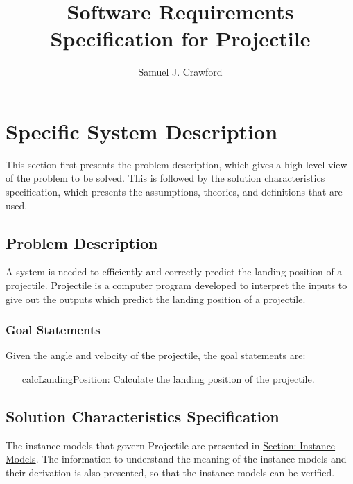 \documentclass[12pt]{article}
\title{Software Requirements Specification for Projectile}
\author{Samuel J. Crawford}
\begin{document}
\maketitle
\tableofcontents
\newpage
\section{Specific System Description}
\label{Sec:SpecSystDesc}
This section first presents the problem description, which gives a high-level view of the problem to be solved. This is followed by the solution characteristics specification, which presents the assumptions, theories, and definitions that are used.
\subsection{Problem Description}
\label{Sec:ProbDesc}
A system is needed to efficiently and correctly predict the landing position of a projectile. Projectile is a computer program developed to interpret the inputs to give out the outputs which predict the landing position of a projectile.
\subsubsection{Goal Statements}
\label{Sec:GoalStmt}
Given the angle and velocity of the projectile, the goal statements are:
\begin{itemize}
\item[calcLandingPosition:\phantomsection\label{calcPosition}]Calculate the landing position of the projectile.
\end{itemize}
\subsection{Solution Characteristics Specification}
\label{Sec:SolCharSpec}
The instance models that govern Projectile are presented in \hyperref[Sec:IMs]{Section: Instance Models}. The information to understand the meaning of the instance models and their derivation is also presented, so that the instance models can be verified.
\end{document}
